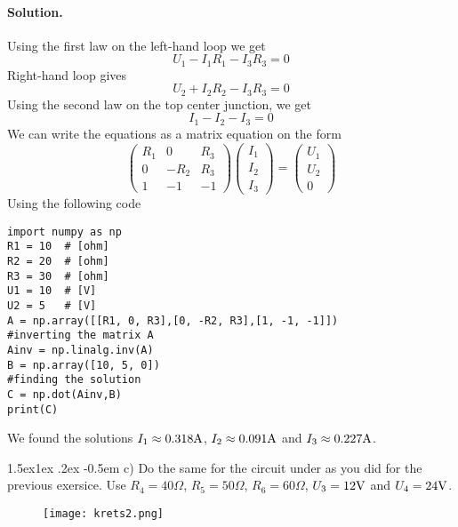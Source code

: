 \documentclass[%
oneside,                 %
final,                   %
10pt]{article}
\makeatletter
\newenvironment{doconceexercise}{}{}
\newcommand\subex{\@startsection{paragraph}{4}{\z@}%
                  {1.5ex\@plus1ex \@minus.2ex}%
                  {-0.5em}%
                  {\normalfont\normalsize\bfseries}}
\makeatother
\begin{document}
\begin{doconceexercise}
\paragraph{Solution.}
Using the first law on the left-hand loop we get
\begin{equation}
U_1 -I_1R_1 - I_3R_3 = 0
\end{equation}
Right-hand loop gives
\begin{equation}
U_2 + I_2R_2 - I_3R_3 = 0
\end{equation}
Using the second law on the top center junction, we get
\begin{equation}
I_1 -I_2 - I_3 = 0
\end{equation}
We can write the equations as a matrix equation on the form
\begin{equation}
\left( \begin{matrix} R_1 & 0 & R_3 \\ 0 & -R_2 & R_3 \\ 1 & -1 & -1 \end{matrix}\right) \left(\begin{matrix}I_1 \\ I_2 \\ I_3\end{matrix}\right) =\left(\begin{matrix}U_1 \\ U_2 \\ 0\end{matrix}\right)
\end{equation}
Using the following code
\begin{verbatim}
import numpy as np
R1 = 10  # [ohm]
R2 = 20  # [ohm]
R3 = 30  # [ohm]
U1 = 10  # [V]
U2 = 5   # [V]
A = np.array([[R1, 0, R3],[0, -R2, R3],[1, -1, -1]])
#inverting the matrix A
Ainv = np.linalg.inv(A)
B = np.array([10, 5, 0])
#finding the solution
C = np.dot(Ainv,B)
print(C)
\end{verbatim}
We found the solutions $I_1 \approx 0.318\rm{A}$, $I_2 \approx 0.091\rm{A}$ and $I_3 \approx 0.227\rm{A}$.


\subex{c)}
Do the same for the circuit under as you did for the previous exersice. Use $R_4 = 40\Omega$, $R_5 = 50\Omega$, $R_6 = 60\Omega$, $U_3 = 12\rm{V}$ and $U_4 = 24\rm{V}$. 
\begin{figure}[h]
\centering
\texttt{[image: krets2.png]}
\end{figure}



\end{doconceexercise}
\end{document}
